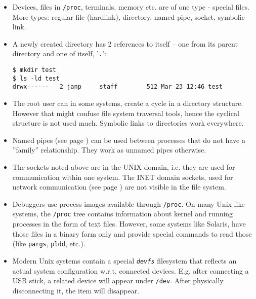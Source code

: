 \begin{itemize}
\item Devices, files in \texttt{/proc}, terminals, memory etc. are of one type
- special files. More types: regular file (hardlink), directory, named pipe,
socket, symbolic link.
\item A newly created directory has 2 references to itself -- one from its parent
directory and one of itself, '\texttt{.}':

\begin{verbatim}
$ mkdir test
$ ls -ld test
drwx------   2 janp     staff        512 Mar 23 12:46 test
\end{verbatim}

\item The root user can in some systems, create a cycle in a directory structure.
However that might confuse file system traversal tools, hence the cyclical
structure is not used much. Symbolic links to directories work everywhere.
\item Named pipes (see page \pageref{MKFIFO}) can be used between processes
that do not have a ''family'' relationship.  They work as unnamed pipes otherwise.
\item The sockets noted above are in the UNIX domain, i.e. they are used for
communication within one system. The INET domain sockets, used for network
communication (see page \pageref{NETWORKING}) are not visible in the file
system.
\item Debuggers use process images available through \texttt{/proc}.
On many Unix-like systems, the \texttt{/proc} tree contains information about
kernel and running processes in the form of text files.  However, some systems
like Solaris, have those files in a binary form only and provide special
commands to read those (like \texttt{pargs}, \texttt{pldd}, etc.).
\item Modern Unix systems contain a special \emph{\texttt{devfs}} filesystem
that reflects an actual system configuration w.r.t. connected devices. E.g.
after connecting a USB stick, a related device will appear under \texttt{/dev}.
After physically disconnecting it, the item will disappear.
\end{itemize}

\endinput
